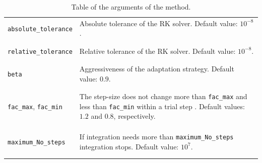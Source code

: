 \documentclass[11pt,a4paper]{article}
\begin{document}
\begin{table}[h!]
\begin{tabular}{l l}
		{\tt absolute\_tolerance} & \multirow{1}{12cm}{Absolute tolerance of the RK solver.  Default value:  $10^{-8}$.}\\\\
		\hline\\[-0.4cm]

		{\tt relative\_tolerance} & \multirow{1}{12cm}{Relative tolerance of the RK solver.  Default value:  $10^{-8}$.}\\\\
		\hline\\[-0.4cm]
		
		{\tt beta} & \multirow{1}{12cm}{Aggressiveness of the adaptation strategy.  Default value:  $0.9$.}\\\\
		\hline\\[-0.4cm]

		{\tt fac\_max}, {\tt fac\_min} &\multirow{1}{12cm}{The step-size does not change more than {\tt fac\_max} and less than {\tt fac\_min} within a trial step . Default values: $1.2$ and $0.8$, respectively.} \\ \\ \\ 
		\hline\\[-0.4cm]
		
		{\tt maximum\_No\_steps} & \multirow{1}{12cm}{If integration needs more than {\tt maximum\_No\_steps} integration stops. Default value: $10^7$.}\\\\
		\hline\\[-0.4cm]
	\end{tabular}
	\caption{Table of the arguments of the  method.}
	\label{tab:solveNSC-input}
\end{table}
%
\end{document}
